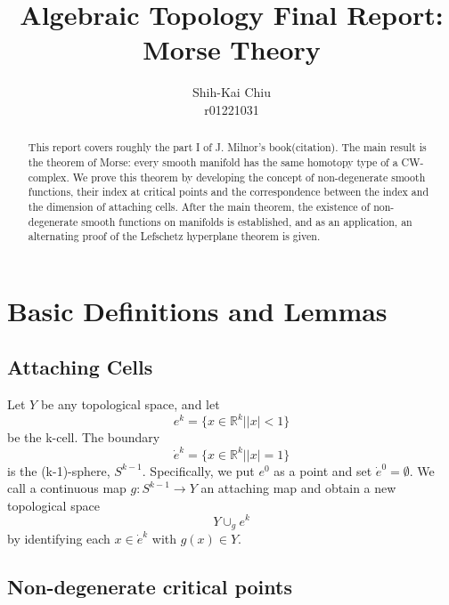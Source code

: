 \documentclass[a4paper,11pt,reqno]{amsart}
\newcommand{\RR}{\mathbb{R}}      %
\begin{document}
\nocite{*}

\title{Algebraic Topology Final Report: Morse Theory}

\author{Shih-Kai Chiu \\
r01221031}

\maketitle

\begin{abstract}
  This report covers roughly the part I of J. Milnor's book(citation). The main
  result is the theorem of Morse: every smooth manifold has the same homotopy
  type of a CW-complex. We prove this theorem by developing the concept of
  non-degenerate smooth functions, their index at critical points and the
  correspondence between the index and the dimension of attaching cells. After
  the main theorem, the existence of non-degenerate smooth functions on
  manifolds is established, and as an application, an alternating proof of the
  Lefschetz hyperplane theorem is given.
\end{abstract}


\section{Basic Definitions and Lemmas}


\subsection{Attaching Cells}

Let $Y$ be any topological space, and let
\begin{equation}
  e^k = \{ x \in \RR^k | \left| x \right| < 1 \}
\end{equation}
be the k-cell. The boundary
\begin{equation}
  \dot{e}^k = \{ x \in \RR^k | \left| x \right| = 1 \}
\end{equation}
is the (k-1)-sphere, $S^{k-1}$. Specifically, we put $e^0$ as a point and set
$\dot{e}^0 = \emptyset$. We call a continuous map $g: S^{k-1} \to Y$ an
attaching map and obtain a new topological space
\begin{equation}
  Y \cup_g e^k
\end{equation}
by identifying each $x \in \dot{e}^k$ with $g(x) \in Y$.


\subsection{Non-degenerate critical points}
\end{document}

